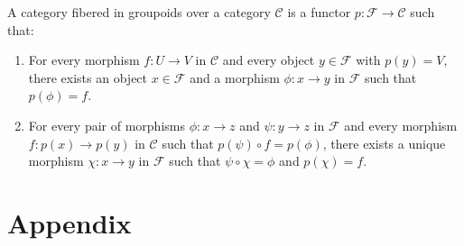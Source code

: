 \documentclass[12pt]{article}
\begin{document}
\begin{definition}
    A category fibered in groupoids over a category $\mathcal{C}$ is a functor $p: \mathcal{F} \to \mathcal{C}$ such that:
    \begin{enumerate}
        \item For every morphism $f: U \to V$ in $\mathcal{C}$ and every object $y \in \mathcal{F}$ with $p(y) = V$, there exists an object $x \in \mathcal{F}$ and a morphism $\phi: x \to y$ in $\mathcal{F}$ such that $p(\phi) = f$.

        \item For every pair of morphisms $\phi: x \to z$ and $\psi: y \to z$ in $\mathcal{F}$ and every morphism $f: p(x) \to p(y)$ in $\mathcal{C}$ such that $p(\psi) \circ f = p(\phi)$, there exists a unique morphism $\chi: x \to y$ in $\mathcal{F}$ such that $\psi \circ \chi = \phi$ and $p(\chi) = f$.
    \end{enumerate}
\end{definition}


\section{Appendix}
\end{document}
